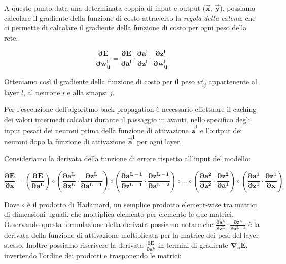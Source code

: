A questo punto data una determinata coppia di input e output ($\mathbf{\vec{x}}$, $\mathbf{\vec{y}}$), possiamo calcolare il gradiente della funzione di costo
attraverso la \textit{regola della catena}, che ci permette di calcolare il gradiente della funzione di costo per ogni peso della rete.

\begin{equation}
    \mathbf{\frac{\partial E}{\partial w^{l}_{ij}} = \frac{\partial E}{\partial a^{l}} \cdot \frac{\partial a^{l}}{\partial z^{l}} \cdot \frac{\partial z^{l}}{\partial w^{l}_{ij}}}
\end{equation}

Otteniamo così il gradiente della funzione di costo per il peso $w^{l}_{ij}$ appartenente al layer $l$, al neurone $i$ e alla sinapsi $j$.

Per l'esecuzione dell'algoritmo back propagation è necessario effettuare il caching dei valori intermedi calcolati durante il passaggio in avanti,
nello specifico degli input pesati dei neuroni prima della funzione di attivazione $\mathbf{\vec{z}^{l}}$ e l'output dei neuroni dopo la funzione di attivazione $\mathbf{\vec{a}^{l}}$
per ogni layer.

Consideriamo la derivata della funzione di errore rispetto all'input del modello:

\begin{equation}
    \mathbf{\frac{\partial E}{\partial x} = (\frac{\partial E}{\partial a^{L}}) \circ (\frac{\partial a^{L}}{\partial z^{L}} \cdot \frac{\partial z^{L}}{\partial a^{L-1}}) \circ (\frac{\partial a^{L-1}}{\partial z^{L-1}} \cdot \frac{\partial z^{L-1}}{\partial a^{L-2}}) \circ \dots \circ (\frac{\partial a^{2}}{\partial z^{2}} \cdot \frac{\partial z^{2}}{\partial a^{1}}) \circ (\frac{\partial a^{1}}{\partial z^{1}} \cdot \frac{\partial z^{1}}{\partial x})}
\end{equation}

Dove $\mathbf{\circ}$ è il prodotto di Hadamard, un semplice prodotto element-wise tra matrici di dimensioni uguali, che moltiplica elemento per elemento le due matrici.
Osservando questa formulazione della derivata possiamo notare che $\mathbf{\frac{\partial a^{L}}{\partial z^{L}} \cdot \frac{\partial z^{L}}{\partial a^{L-1}}}$ è la derivata della funzione di attivazione 
moltiplicata per la matrice dei pesi del layer stesso. 
Inoltre possiamo riscrivere la derivata $\mathbf{\frac{\partial E}{\partial a^{L}}}$ in termini di gradiente
$\mathbf{\nabla_{a} E}$, invertendo l'ordine dei prodotti e trasponendo le matrici:

